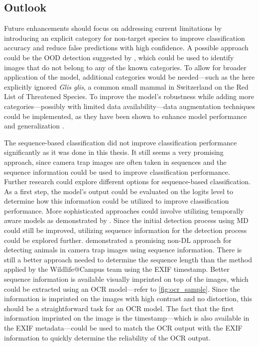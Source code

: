 \subsection{Outlook}
Future enhancements should focus on addressing current limitations by introducing an explicit category for non-target species to improve classification accuracy and reduce false predictions with high confidence.
A possible approach could be the \ac{OOD} detection suggested by \textcite{hendrycksBaselineDetectingMisclassified2018}, which could be used to identify images that do not belong to any of the known categories.
To allow for broader application of the model, additional categories would be needed---such as the here explicitly ignored \textit{Glis glis}, a common small mammal in Switzerland on the \textcite{iucnIUCNRedList2025} Red List of Threatened Species.
To improve the model's robustness while adding more categories---possibly with limited data availability---data augmentation techniques could be implemented, as they have been shown to enhance model performance and generalization \autocite{shortenSurveyImageData2019}.

The sequence-based classification did not improve classification performance significantly as it was done in this thesis.
It still seems a very promising approach, since camera trap images are often taken in sequences and the sequence information could be used to improve classification performance.
Further research could explore different options for sequence-based classification.
As a first step, the model's output could be evaluated on the logits level to determine how this information could be utilized to improve classification performance.
More sophisticated approaches could involve utilizing temporally aware models as demonstrated by \textcite{muhammadTemporalSwinFPNNetNovel2024}.
Since the initial detection process using \ac{MD} could still be improved, utilizing sequence information for the detection process could be explored further.
\textcite{zotinANIMALDETECTIONUSING2019} demonstrated a promising non-\ac{DL} approach for detecting animals in camera trap images using sequence information.
There is still a better approach needed to determine the sequence length than the method applied by the Wildlife@Campus team using the \ac{EXIF} timestamp.
Better sequence information is available visually imprinted on top of the images, which could be extracted using an \ac{OCR} model---refer to \autoref{fig:ocr_sample}.
Since the information is imprinted on the images with high contrast and no distortion, this should be a straightforward task for an \ac{OCR} model.
The fact that the first information imprinted on the image is the timestamp---which is also available in the \ac{EXIF} metadata---could be used to match the \ac{OCR} output with the \ac{EXIF} information to quickly determine the reliability of the \ac{OCR} output.


